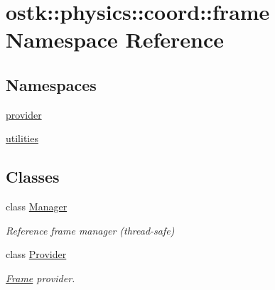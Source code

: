 \hypertarget{namespaceostk_1_1physics_1_1coord_1_1frame}{}\section{ostk\+:\+:physics\+:\+:coord\+:\+:frame Namespace Reference}
\label{namespaceostk_1_1physics_1_1coord_1_1frame}
\subsection*{Namespaces}
\begin{DoxyCompactItemize}
\item 
 \hyperlink{namespaceostk_1_1physics_1_1coord_1_1frame_1_1provider}{provider}
\item 
 \hyperlink{namespaceostk_1_1physics_1_1coord_1_1frame_1_1utilities}{utilities}
\end{DoxyCompactItemize}
\subsection*{Classes}
\begin{DoxyCompactItemize}
\item 
class \hyperlink{classostk_1_1physics_1_1coord_1_1frame_1_1_manager}{Manager}
\begin{DoxyCompactList}\small\item\em Reference frame manager (thread-\/safe) \end{DoxyCompactList}\item 
class \hyperlink{classostk_1_1physics_1_1coord_1_1frame_1_1_provider}{Provider}
\begin{DoxyCompactList}\small\item\em \hyperlink{classostk_1_1physics_1_1coord_1_1_frame}{Frame} provider. \end{DoxyCompactList}\end{DoxyCompactItemize}
